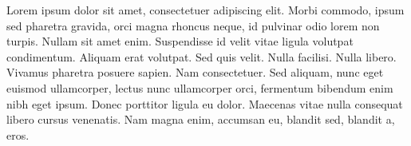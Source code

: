 
Lorem ipsum dolor sit amet, consectetuer adipiscing elit. Morbi commodo, ipsum sed pharetra gravida, orci magna rhoncus neque, id pulvinar odio lorem non turpis. Nullam sit amet enim. Suspendisse id velit vitae ligula volutpat condimentum. Aliquam erat volutpat. Sed quis velit. Nulla facilisi. Nulla libero. Vivamus pharetra posuere sapien. Nam consectetuer. Sed aliquam, nunc eget euismod ullamcorper, lectus nunc ullamcorper orci, fermentum bibendum enim nibh eget ipsum. Donec porttitor ligula eu dolor. Maecenas vitae nulla consequat libero cursus venenatis. Nam magna enim, accumsan eu, blandit sed, blandit a, eros.

